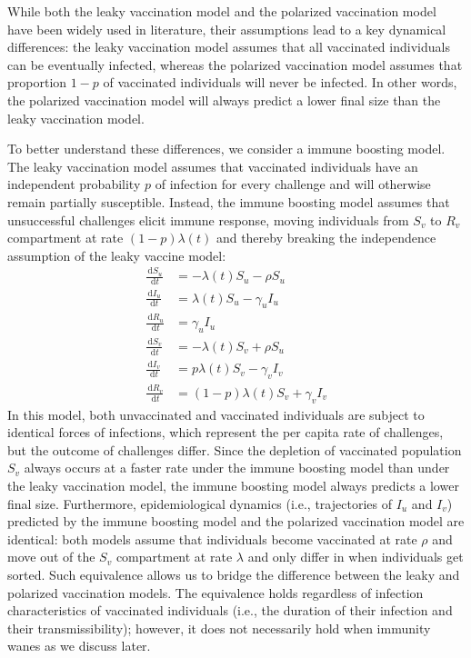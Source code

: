 \documentclass[12pt]{article}
\newcommand{\dd}[1]{\ensuremath{\, \mathrm{d}#1}}
\begin{document}
While both the leaky vaccination model and the polarized vaccination model have been widely used in literature, their assumptions lead to a key dynamical differences: the leaky vaccination model assumes that all vaccinated individuals can be eventually infected, whereas the polarized vaccination model assumes that proportion $1-p$ of vaccinated individuals will never be infected.
In other words, the polarized vaccination model will always predict a lower final size than the leaky vaccination model.

To better understand these differences, we consider a immune boosting model.
The leaky vaccination model assumes that vaccinated individuals have an independent probability $p$ of infection for every challenge and will otherwise remain partially susceptible.
Instead, the immune boosting model assumes that unsuccessful challenges elicit immune response, moving individuals from $S_v$ to $R_v$ compartment at rate $(1-p) \lambda(t)$ and thereby breaking the independence assumption of the leaky vaccine model:  
\begin{align}
\frac{\dd S_u}{\dd t} &= - \lambda(t) S_u - \rho S_u \\
\frac{\dd I_u}{\dd t} &= \lambda(t) S_u - \gamma_u I_u \\
\frac{\dd R_u}{\dd t} &= \gamma_u I_u \\
\frac{\dd S_v}{\dd t} &= - \lambda(t) S_v + \rho S_u \\
\frac{\dd I_v}{\dd t} &= p \lambda(t) S_v - \gamma_v I_v \\
\frac{\dd R_v}{\dd t} &= (1-p) \lambda(t) S_v + \gamma_v I_v
\end{align}
In this model, both unvaccinated and vaccinated individuals are subject to identical forces of infections, which represent the per capita rate of challenges, but the outcome of challenges differ.
Since the depletion of vaccinated population $S_v$ always occurs at a faster rate under the immune boosting model than under the leaky vaccination model, the immune boosting model always predicts a lower final size.
Furthermore, epidemiological dynamics (i.e., trajectories of $I_u$ and $I_v$) predicted by the immune boosting model and the polarized vaccination model are identical: 
both models assume that individuals become vaccinated at rate $\rho$ and move out of the $S_v$ compartment at rate $\lambda$ and only differ in when individuals get sorted.
Such equivalence allows us to bridge the difference between the leaky and polarized vaccination models.
The equivalence holds regardless of infection characteristics of vaccinated individuals (i.e., the duration of their infection and their transmissibility);
however, it does not necessarily hold when immunity wanes as we discuss later.
\end{document}
